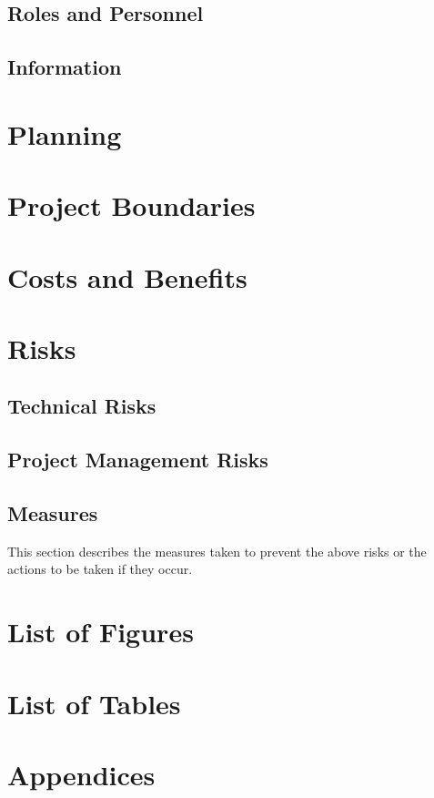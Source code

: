 \documentclass{article}
\begin{document}
\subsection{Roles and Personnel}
\subsection{Information}


\newpage
\section{Planning}


\newpage
\section{Project Boundaries}


\newpage
\section{Costs and Benefits}


\newpage
\section{Risks}
\subsection{Technical Risks}
\subsection{Project Management Risks}
\subsection{Measures}
This section describes the measures taken to prevent the above risks or the actions to be taken if they occur.


\newpage

\section{List of Figures}

\section{List of Tables}

\section{Appendices}
\end{document}
